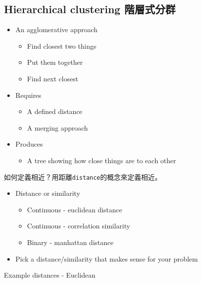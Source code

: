 \documentclass[]{book}
\providecommand{\tightlist}{%
  \setlength{\itemsep}{0pt}\setlength{\parskip}{0pt}}
\begin{document}
\hypertarget{hierarchical-clustering-ux968eux5c64ux5f0fux5206ux7fa4}{%
\subsection{Hierarchical clustering 階層式分群}\label{hierarchical-clustering-ux968eux5c64ux5f0fux5206ux7fa4}}

\begin{itemize}
\tightlist
\item
  An agglomerative approach

  \begin{itemize}
  \tightlist
  \item
    Find closest two things
  \item
    Put them together
  \item
    Find next closest
  \end{itemize}
\item
  Requires

  \begin{itemize}
  \tightlist
  \item
    A defined distance
  \item
    A merging approach
  \end{itemize}
\item
  Produces

  \begin{itemize}
  \tightlist
  \item
    A tree showing how close things are to each other
  \end{itemize}
\end{itemize}

如何定義相近？用距離\texttt{distance}的概念來定義相近。

\begin{itemize}
\tightlist
\item
  Distance or similarity

  \begin{itemize}
  \tightlist
  \item
    Continuous - euclidean distance
  \item
    Continuous - correlation similarity
  \item
    Binary - manhattan distance
  \end{itemize}
\item
  Pick a distance/similarity that makes sense for your problem
\end{itemize}

Example distances - Euclidean
\end{document}
